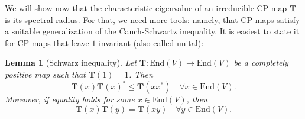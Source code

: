\documentclass{article}
\newtheorem{lemma}{Lemma}
\newcommand{\End}{\mathrm{End}}
\begin{document}
We will show now that the characteristic eigenvalue of an irreducible CP map $\mathbf{T}$ is its spectral radius. For that, we need more tools: namely, that CP maps satisfy a suitable generalization of the Cauch-Schwartz inequality. It is easiest to state it for CP maps that leave $1$ invariant (also called unital):
\begin{lemma}[Schwarz inequality]\label{lem:Schwarz}
  Let $\mathbf{T}:\End(V) \to \End(V)$ be a completely positive map such that $\mathbf{T}(1)=1$. Then 
  \begin{equation*}
    \mathbf{T}(x) \mathbf{T}(x)^* \leq \mathbf{T}(xx^*) \quad \forall x\in\End(V).
  \end{equation*}
  Moreover, if equality holds for some $x\in\End(V)$, then 
  \begin{equation*}
    \mathbf{T}(x) \mathbf{T}(y) = \mathbf{T}(xy)  \quad \forall y\in\End(V).
  \end{equation*}
\end{lemma}
\end{document}
